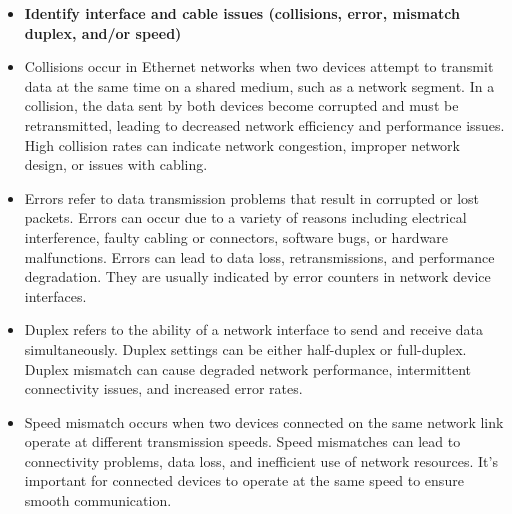 \documentclass{article}
\begin{document}
\begin{itemize}
  \item \textbf{Identify interface and cable issues (collisions, error, mismatch duplex, and/or speed)}
  	\item[] Collisions occur in Ethernet networks when two devices attempt to transmit data at the same time on a shared medium, such as a network segment. In a collision, the data sent by both devices become corrupted and must be retransmitted, leading to decreased network efficiency and performance issues. High collision rates can indicate network congestion, improper network design, or issues with cabling. 
  	\item[] Errors refer to data transmission problems that result in corrupted or lost packets. Errors can occur due to a variety of reasons including electrical interference, faulty cabling or connectors, software bugs, or hardware malfunctions. Errors can lead to data loss, retransmissions, and performance degradation. They are usually indicated by error counters in network device interfaces.
	\item[] Duplex refers to the ability of a network interface to send and receive data simultaneously. Duplex settings can be either half-duplex or full-duplex. Duplex mismatch can cause degraded network performance, intermittent connectivity issues, and increased error rates.
 	\item[] Speed mismatch occurs when two devices connected on the same network link operate at different transmission speeds. Speed mismatches can lead to connectivity problems, data loss, and inefficient use of network resources. It's important for connected devices to operate at the same speed to ensure smooth communication.
  	

\end{itemize}
\end{document}
